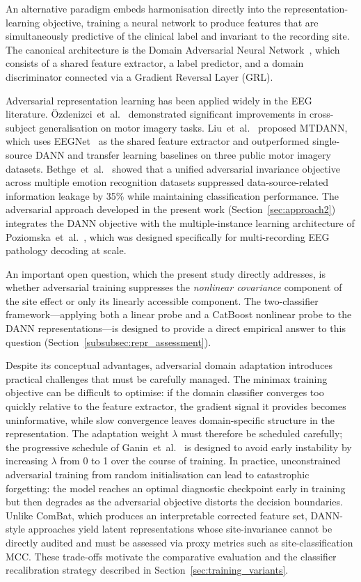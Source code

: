 \documentclass[preprint,12pt]{elsarticle}
\begin{document}
An alternative paradigm embeds harmonisation directly into the
representation-learning objective, training a neural network to
produce features that are simultaneously predictive of the clinical
label and invariant to the recording site.
The canonical architecture is the Domain Adversarial Neural
Network~\cite{ganin2016domain}, which consists of a shared feature
extractor, a label predictor, and a domain discriminator connected via
a Gradient Reversal Layer (GRL).

Adversarial representation learning has been applied widely in the
EEG literature.
\"{O}zdenizci~et~al.~\cite{ozdenizci2020invariant} demonstrated
significant improvements in cross-subject generalisation on motor
imagery tasks.
Liu~et~al.~\cite{liu2023multisource} proposed MTDANN, which uses
EEGNet~\cite{lawhern2018eegnet} as the shared feature extractor and
outperformed single-source DANN and transfer learning baselines on
three public motor imagery datasets.
Bethge~et~al.~\cite{bethge2022multidomain} showed that a unified
adversarial invariance objective across multiple emotion recognition
datasets suppressed data-source-related information leakage by 35\%
while maintaining classification performance.
The adversarial approach developed in the present work
(Section~\ref{sec:approach2}) integrates the DANN objective
with the multiple-instance learning architecture of
Poziomska~et~al.~\cite{poziomska2026quantity}, which was designed
specifically for multi-recording EEG pathology decoding at scale.

An important open question, which the present study directly
addresses, is whether adversarial training suppresses the
\emph{nonlinear covariance} component of the site effect or only its
linearly accessible component.
The two-classifier framework---applying both a linear probe and a
CatBoost nonlinear probe to the DANN representations---is designed to
provide a direct empirical answer to this question
(Section~\ref{subsubsec:repr_assessment}).

Despite its conceptual advantages, adversarial domain adaptation
introduces practical challenges that must be carefully managed.
The minimax training objective can be difficult to optimise: if the
domain classifier converges too quickly relative to the feature
extractor, the gradient signal it provides becomes uninformative,
while slow convergence leaves domain-specific structure in the
representation.
The adaptation weight $\lambda$ must therefore be scheduled carefully;
the progressive schedule of Ganin~et~al.~\cite{ganin2016domain} is
designed to avoid early instability by increasing $\lambda$ from 0 to
1 over the course of training.
In practice, unconstrained adversarial training from random
initialisation can lead to catastrophic forgetting: the model reaches
an optimal diagnostic checkpoint early in training but then degrades
as the adversarial objective distorts the decision boundaries.
Unlike ComBat, which produces an interpretable corrected feature set,
DANN-style approaches yield latent representations whose
site-invariance cannot be directly audited and must be assessed via
proxy metrics such as site-classification MCC.
These trade-offs motivate the comparative evaluation and the
classifier recalibration strategy described in
Section~\ref{sec:training_variants}.
\end{document}
